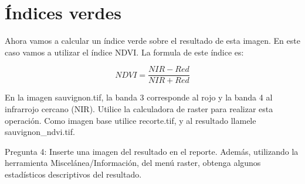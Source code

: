 \documentclass[onecolumn]{article}
\begin{document}
\section{Índices verdes}

Ahora vamos a calcular un índice verde sobre el resultado de esta imagen. En este caso vamos a utilizar el índice NDVI. La formula de este índice es:

\begin{equation}
NDVI = \frac{NIR - Red}{NIR + Red}
\end{equation}

En la imagen sauvignon.tif, la banda 3 corresponde al rojo y la banda 4 al infrarrojo cercano (NIR). Utilice la calculadora de raster para realizar esta operación. Como imagen base utilice recorte.tif, y al resultado llamele sauvignon\_ndvi.tif.

\begin{mdframed}[]
	Pregunta 4: Inserte una imagen del resultado en el reporte. Además, utilizando la herramienta Miscelánea/Información, del menú raster, obtenga algunos estadísticos descriptivos del resultado.
\end{mdframed}
\end{document}
